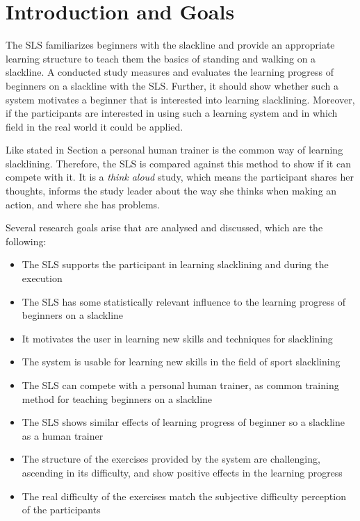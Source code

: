 \section{Introduction and Goals}\label{6_introduction}
The SLS familiarizes beginners with the slackline and provide an appropriate learning structure to teach them the basics of standing and walking on a slackline.
A conducted study measures and evaluates the learning progress of beginners on a slackline with the SLS.
Further, it should show whether such a system motivates a beginner that is interested into learning slacklining.
Moreover, if the participants are interested in using such a learning system and in which field in the real world it could be applied.

Like stated in Section  a personal human trainer is the common way of learning slacklining.
Therefore, the SLS is compared against this method to show if it can compete with it.
It is a \textit{think aloud} study, which means the participant shares her thoughts, informs the study leader about the way she thinks when making an action, and where she has problems.

Several research goals arise that are analysed and discussed, which are the following:

\begin{itemize}
\item The SLS supports the participant in learning slacklining and during the execution
\item The SLS has some statistically relevant influence to the learning progress of beginners on a slackline
\item It motivates the user in learning new skills and techniques for slacklining
\item The system is usable for learning new skills in the field of sport slacklining
\item The SLS can compete with a personal human trainer, as common training method for teaching beginners on a slackline
\item The SLS shows similar effects of learning progress of beginner so a slackline as a human trainer
\item The structure of the exercises provided by the system are challenging, ascending in its difficulty, and show positive effects in the learning progress
\item The real difficulty of the exercises match the subjective difficulty perception of the participants
\end{itemize}
